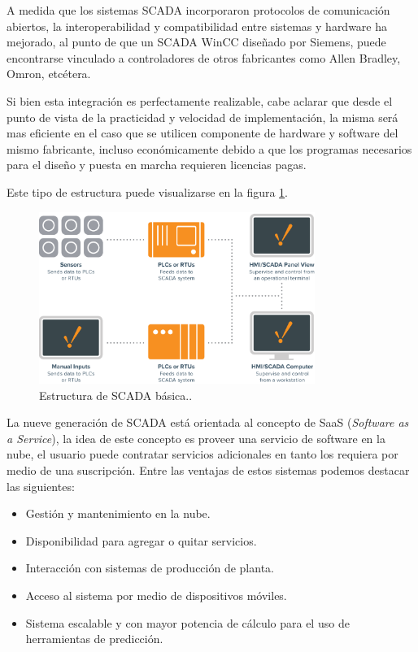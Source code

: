 A medida que los sistemas SCADA incorporaron protocolos de comunicación abiertos, la interoperabilidad y compatibilidad entre sistemas y hardware ha mejorado, al punto de que un SCADA WinCC diseñado por Siemens, puede encontrarse vinculado a controladores de otros fabricantes como Allen Bradley, Omron, etcétera.

Si bien esta integración es perfectamente realizable, cabe aclarar que desde el punto de vista de la practicidad y velocidad de implementación, la misma será mas eficiente en el caso que se utilicen componente de hardware y software del mismo fabricante, incluso económicamente debido a que los programas necesarios para el diseño y puesta en marcha requieren licencias pagas.

Este tipo de estructura puede visualizarse en la figura \ref{fig:SCNOW}.

\begin{figure}[htbp]
	\centering
	\includegraphics[width=0.8\textwidth]{./Figures/BasicSCADA.png}
	\caption{Estructura de SCADA básica.\protect\footnotemark.}
	\label{fig:SCNOW}
\end{figure}
 
La nueve generación de SCADA está orientada al concepto de SaaS (\textit{Software as a Service}), la idea de este concepto es proveer una servicio de software en la nube, el usuario puede contratar servicios adicionales en tanto los requiera por medio de una suscripción. Entre las ventajas de estos sistemas podemos destacar las siguientes:

\begin{itemize}
	\item Gestión y mantenimiento en la nube.
	\item Disponibilidad para agregar o quitar servicios.
	\item Interacción con sistemas de producción de planta.
	\item Acceso al sistema por medio de dispositivos móviles. 
	\item Sistema escalable y con mayor potencia de cálculo para el uso de herramientas de predicción.
\end{itemize}


